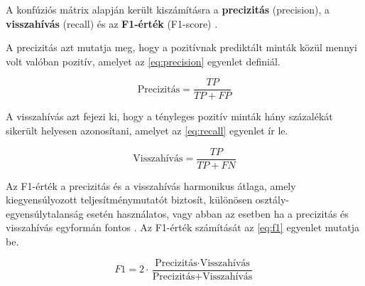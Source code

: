 A konfúziós mátrix alapján került kiszámításra a \textbf{precizitás} (precision), a \textbf{visszahívás} (recall) és az \textbf{F1-érték} (F1-score) \cite{ibm_confusion_matrix}. 

A precizitás azt mutatja meg, hogy a pozitívnak prediktált minták közül mennyi volt valóban pozitív, amelyet az \ref{eq:precision} egyenlet definiál.

\begin{equation}
\text{Precizitás} = \frac{TP}{TP + FP}
\label{eq:precision}
\end{equation}

A visszahívás azt fejezi ki, hogy a tényleges pozitív minták hány százalékát sikerült helyesen azonosítani, amelyet az \ref{eq:recall} egyenlet ír le.

\begin{equation}
\text{Visszahívás} = \frac{TP}{TP + FN}
\label{eq:recall}
\end{equation}

Az F1-érték a precizitás és a visszahívás harmonikus átlaga, amely kiegyensúlyozott teljesítménymutatót biztosít, különösen osztály-egyensúlytalanság esetén használatos, vagy abban az esetben ha a precizitás és visszahívás egyformán fontos \cite{ibm_confusion_matrix}. Az F1-érték számítását az \ref{eq:f1} egyenlet mutatja be.

\begin{equation}
F1 = 2 \cdot \frac{\text{Precizitás} \cdot \text{Visszahívás}}{\text{Precizitás} + \text{Visszahívás}}
\label{eq:f1}
\end{equation}